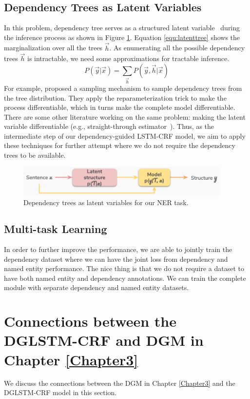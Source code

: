 \subsection{Dependency Trees as Latent Variables}
In this problem, dependency tree serves as a structured latent variable~\cite{martins2019latent} during the inference process as shown in Figure \ref{fig:latenttree}. 
Equation \ref{equ:latenttree} shows the marginalization over all the trees $\vec{h}$.
As enumerating all the possible dependency trees $\vec{h}$ is intractable, we need some approximations for tractable inference. 
\begin{equation}
P(\vec{y} \vert \vec{x}) = \sum_{ \vec{h} } P (\vec{y}, \vec{h} \vert \vec{x})
\label{equ:latenttree}
\end{equation}
For example, \citet{corro2019learning} proposed a sampling mechanism to sample dependency trees from the tree distribution. 
They apply the reparameterization trick to make the process differentiable, which in turns make the complete model differentiable. 
There are some other literature working on the same problem: making the latent variable differentiable (e.g., straight-through estimator~\cite{bengio2013estimating}).
Thus, as the intermediate step of our dependency-guided LSTM-CRF model, we aim to apply these techniques for further attempt where we do not require the dependency trees to be available.

\begin{figure}[h!]
	\centering
	\includegraphics[width=4.2in]{Figures/latent_tree.png}
	\caption{Dependency trees as latent variables for our NER task.}
	\label{fig:latenttree}
\end{figure}

\subsection{Multi-task Learning}
In order to further improve the performance, we are able to jointly train the dependency dataset where we can have the joint loss from dependency and named entity performance.
The nice thing is that we do not require a dataset to have both named entity and dependency annotations. 
We can train the complete module with separate dependency and named entity datasets.

\section{Connections between the DGLSTM-CRF and DGM in Chapter \ref{Chapter3}}
We discuss the connections between the DGM in Chapter \ref{Chapter3} and the DGLSTM-CRF model in this section. 

